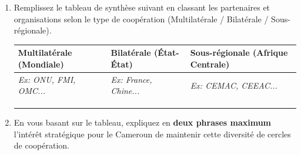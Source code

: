 \documentclass[11pt]{article}
\begin{document}
\begin{exercice}
\begin{enumerate}
    \item Remplissez le tableau de synthèse suivant en classant les partenaires et organisations selon le type de coopération (Multilatérale / Bilatérale / Sous-régionale).
    \begin{tabular}{|p{3.5cm}|p{3.5cm}|p{3.5cm}|}
    \hline
    \textbf{Multilatérale (Mondiale)} & \textbf{Bilatérale (État-État)} & \textbf{Sous-régionale (Afrique Centrale)} \\
    \hline
    \textit{Ex: ONU, FMI, OMC...} & \textit{Ex: France, Chine...} & \textit{Ex: CEMAC, CEEAC...} \\
    \hline
    & & \\
    \hline
    & & \\
    \hline
    & & \\
    \hline
    \end{tabular}
    \item En vous basant sur le tableau, expliquez en \textbf{deux phrases maximum} l'intérêt stratégique pour le Cameroun de maintenir cette diversité de cercles de coopération.
\end{enumerate}
\end{exercice}
\end{document}

